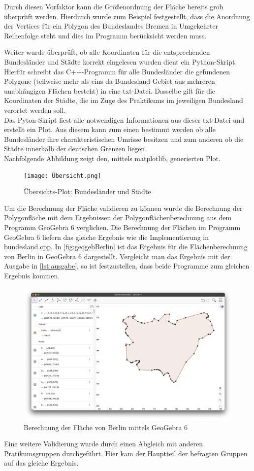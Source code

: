 \documentclass[12pt]{scrartcl}
\begin{document}
Durch diesen Vorfaktor kann die Größenordnung der Fläche bereits grob überprüft werden. Hierdurch wurde zum Beispiel festgestellt, dass die Anordnung der Vertices für ein Polygon des Bundeslandes Bremen in Umgekehrter Reihenfolge steht und dies im Programm berücksicht werden muss.

Weiter wurde überprüft, ob alle Koordinaten für die entsprechenden Bundesländer und Städte korrekt eingelesen wurden dient ein Python-Skript.
Hierfür schreibt das C++-Programm für alle Bundesländer die gefundenen Polygone (teilweise mehr als eins da Bundesland-Gebiet aus mehreren unabhängigen Flächen besteht) in eine txt-Datei.
Dasselbe gilt für die Koordinaten der Städte, die im Zuge des Praktikums im jeweiligen Bundesland verortet werden soll.\\

Das Pyton-Skript liest alle notwendigen Informationen aus dieser txt-Datei und erstellt ein Plot. Aus diesem kann zum einen bestimmt werden ob alle Bundesländer ihre charakteristischen Umrisse besitzen
und zum anderen ob die Städte innerhalb der deutschen Grenzen liegen.\\
Nachfolgende Abbildung zeigt den, mittels matplotlib, generierten Plot.

\begin{figure}[ht]
    \centering
    \texttt{[image: Übersicht.png]}
    \caption{Übersichts-Plot: Bundesländer und Städte}
\end{figure}

Um die Berechnung der Fläche validieren zu können wurde die Berechnung der Polygonfläche mit dem Ergebnissen der Polygonflächenberechnung aus dem Programm GeoGebra 6 verglichen.
Die Berechnung der Flächen im Programm GeoGebra 6 liefern das gleiche Ergebnis wie die Implementierung in bundesland.cpp.
In \autoref{fig:geogebBerlin} ist das Ergebnis für die Flächenberechnung von Berlin in GeoGebra 6 dargestellt.
Vergleicht man das Ergebnis mit der Ausgabe in \autoref{lst:ausgabe}, so ist festzustellen, dass beide Programme zum gleichen Ergebnis kommen.

\begin{figure}[ht]
    \centering
    \includegraphics[scale=0.25]{GeoGebra Berlin.png}
    \caption{Berechnung der Fläche von Berlin mittels GeoGebra 6}
    \label{fig:geogebBerlin}
\end{figure}

Eine weitere Validierung wurde durch einen Abgleich mit anderen Pratikumsgruppen durchgeführt.
Hier kam der Hauptteil der befragten Gruppen auf das gleiche Ergebnis.
\end{document}
